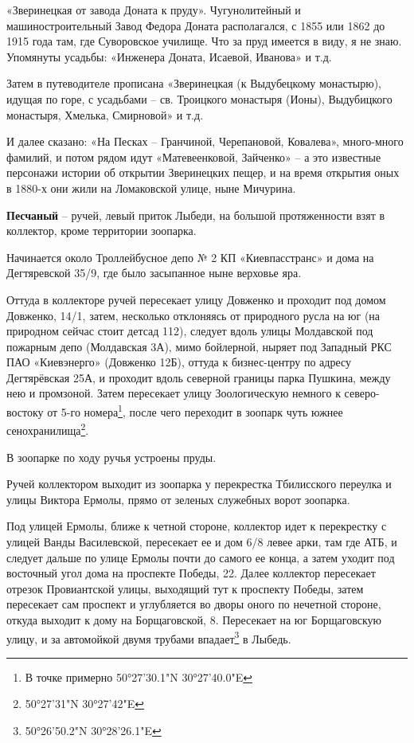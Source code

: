 «Зверинецкая от завода Доната к пруду». Чугунолитейный и машиностроительный Завод Федора Доната располагался, с 1855 или 1862 до 1915 года там, где Суворовское училище. Что за пруд имеется в виду, я не знаю. Упомянуты усадьбы: «Инженера Доната, Исаевой, Иванова» и т.д.

Затем в путеводителе прописана «Зверинецкая (к Выдубецкому монастырю), идущая по горе, с усадьбами – св. Троицкого монастыря (Ионы), Выдубицкого монастыря, Хмелька, Смирновой» и т.д.

И далее сказано: «На Песках – Гранчиной, Черепановой, Ковалева», много-много фамилий, и потом рядом идут «Матевеенковой, Зайченко» – а это известные персонажи истории об открытии Зверинецких пещер, и на время открытия оных в 1880-х они жили на Ломаковской улице, ныне Мичурина.\\

\medskip

\textbf{Песчаный} – ручей, левый приток Лыбеди, на большой протяженности взят в коллектор, кроме территории зоопарка.

Начинается около Троллейбусное депо № 2 КП «Киевпасстранс» и дома на Дегтяревской 35/9, где было засыпанное ныне верховье яра. 

Оттуда в коллекторе ручей пересекает улицу Довженко и проходит под домом Довженко, 14/1, затем, несколько отклоняясь от природного русла на юг (на природном сейчас стоит детсад 112), следует вдоль улицы Молдавской под пожарным депо (Молдавская 3А), мимо  бойлерной, ныряет под Западный РКС ПАО «Киевэнерго» (Довженко 12Б), оттуда к бизнес-центру по адресу Дегтярёвская 25А, и проходит вдоль северной границы парка Пушкина, между нею и промзоной. Затем пересекает улицу Зоологическую немного к северо-востоку от 5-го номера\footnote{В точке примерно 50°27'30.1"N 30°27'40.0"E}, после чего переходит в зоопарк чуть южнее сенохранилища\footnote{50°27'31"N 30°27'42"E}.

В зоопарке по ходу ручья устроены пруды.

Ручей коллектором выходит из зоопарка у перекрестка Тбилисского переулка и улицы Виктора Ермолы, прямо от зеленых служебных ворот зоопарка.

Под улицей Ермолы, ближе к четной стороне, коллектор идет к перекрестку с улицей Ванды Василевской, пересекает ее и дом 6/8 левее арки, там где АТБ, и следует дальше по улице Ермолы почти до самого ее конца, а затем уходит под восточный угол дома на проспекте Победы, 22. Далее коллектор пересекает отрезок Провиантской улицы, выходящий тут к проспекту Победы, затем пересекает сам проспект и углубляется во дворы оного по нечетной стороне, откуда выходит к дому на Борщаговской, 8. Пересекает на юг Борщаговскую улицу, и за автомойкой двумя трубами впадает\footnote{50°26'50.2"N 30°28'26.1"E} в Лыбедь.\\

